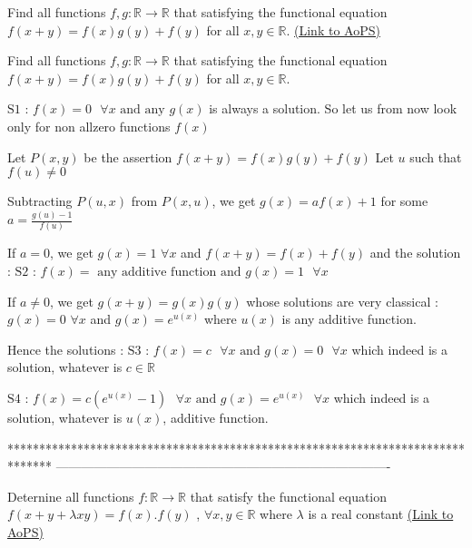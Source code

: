 \begin{problem}
	Find all functions $f,g : \mathbb{R}\rightarrow \mathbb{R}$ that satisfying the functional equation
$ f\left (  x+y\right )=f\left ( x \right )g\left ( y \right ) +  f\left (y \right )$ for all $x,y \in \mathbb{R}$.
	\flushright \href{https://artofproblemsolving.com/community/c6h591643}{(Link to AoPS)}
\end{problem}



\begin{solution}
	\begin{tcolorbox}Find all functions $f,g : \mathbb{R}\rightarrow \mathbb{R}$ that satisfying the functional equation
$ f\left (  x+y\right )=f\left ( x \right )g\left ( y \right ) +  f\left (y \right )$ for all $x,y \in \mathbb{R}$.\end{tcolorbox}
$\boxed{\text{S1 : }f(x)=0\text{   }\forall x\text{ and any }g(x)}$ is always a solution.
So let us from now look only for non allzero functions $f(x)$

Let $P(x,y)$ be the assertion $f(x+y)=f(x)g(y)+f(y)$
Let $u$ such that $f(u)\ne 0$

Subtracting $P(u,x)$ from $P(x,u)$, we get $g(x)=af(x)+1$ for some $a=\frac{g(u)-1}{f(u)}$

If $a=0$, we get $g(x)=1$ $\forall x$ and $f(x+y)=f(x)+f(y)$ and the solution :
$\boxed{\text{S2 : }f(x)=\text{ any additive function and }g(x)=1\text{   }\forall x}$

If $a\ne 0$, we get $g(x+y)=g(x)g(y)$ whose solutions are very classical  : $g(x)=0$ $\forall x$ and $g(x)=e^{u(x)}$ where $u(x)$ is any additive function.

Hence the solutions :
$\boxed{\text{S3 : }f(x)=c\text{   }\forall x\text{ and }g(x)=0\text{   }\forall x}$ which indeed is a solution, whatever is $c \in\mathbb R$

$\boxed{\text{S4 : }f(x)=c(e^{u(x)}-1)\text{   }\forall x\text{ and }g(x)=e^{u(x)}\text{   }\forall x}$ which indeed is a solution, whatever is $u(x)$, additive function.
\end{solution}
*******************************************************************************
-------------------------------------------------------------------------------

\begin{problem}
	Deternine all functions $f : \mathbb{R}\rightarrow \mathbb{R}$ that satisfy the functional equation
$ f (  x+y + \lambda xy)=f ( x  ). f ( y )$  , $\forall x,y\in \mathbb{R}$
where $\lambda$ is a real constant
	\flushright \href{https://artofproblemsolving.com/community/c6h591644}{(Link to AoPS)}
\end{problem}



